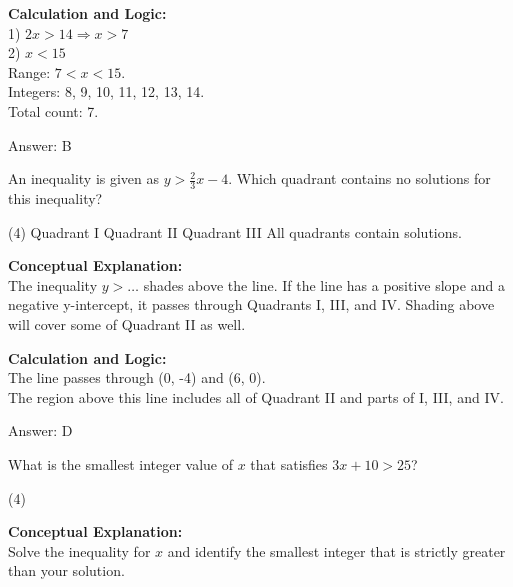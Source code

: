 \documentclass[11pt,paper=a4,answers]{exam}
\begin{document}
\begin{questions}
\begin{solution}
\vspace{10pt}
\textbf{Calculation and Logic:} \\
1) $2x > 14 \Rightarrow x > 7$ \\
2) $x < 15$ \\
Range: $7 < x < 15$. \\
Integers: 8, 9, 10, 11, 12, 13, 14. \\
Total count: 7.

\vspace{15pt}
Answer: \colorbox{yellow!100}{B}
\end{solution}

\vspace{20pt}

\question
An inequality is given as $y > \frac{2}{3}x - 4$. Which quadrant contains no solutions for this inequality?
\begin{tasks}(4)
    \task Quadrant I
    \task Quadrant II
    \task Quadrant III
    \task All quadrants contain solutions.
\end{tasks}

\begin{solution}
\textbf{Conceptual Explanation:} \\
The inequality $y > \dots$ shades above the line. If the line has a positive slope and a negative y-intercept, it passes through Quadrants I, III, and IV. Shading above will cover some of Quadrant II as well.

\vspace{10pt}
\textbf{Calculation and Logic:} \\
The line passes through (0, -4) and (6, 0). \\
The region above this line includes all of Quadrant II and parts of I, III, and IV.

\vspace{15pt}
Answer: \colorbox{yellow!100}{D}
\end{solution}

\vspace{20pt}

\question
What is the smallest integer value of $x$ that satisfies $3x + 10 > 25$?
\begin{tasks}(4)
\end{tasks}

\begin{solution}
\textbf{Conceptual Explanation:} \\
Solve the inequality for $x$ and identify the smallest integer that is strictly greater than your solution.


\end{solution}
\end{questions}
\end{document}
